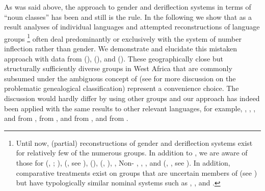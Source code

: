 \documentclass[output=collectionpaper]{langsci/langscibook}
\begin{document}
As was said above, the approach to  gender and deriflection systems in terms of ``noun classes'' has been and still is the rule. In the following we show that as a result analyses of individual languages and attempted reconstructions of language groups%
\footnote{Until now, (partial) reconstructions of gender and deriflection systems exist for relatively few of the numerous  groups. In addition to , we are aware of those for  (\citealt{Manessy1967}, \citeyear{Manessy1975}; \citealt{Miehe2012}),  (\citealt{Heine1968}, see ),  (\citealt{DeWolf1971}),  (\citealt{Bokula1971}, \citealt{Pasch1986}),  \citep{Doneux1975}, Non-  \citep{Hyman1980},  \citep{Elugbe1983},  \citep{Connell1987}, and  (\citealt{Manessy1987}, \citealt{Snider1988}, see ). In addition, comparative treatments exist on groups that are uncertain members of  (see \citealt{Gueldemann2018}) but have typologically similar nominal systems such as  \citep{Schadeberg1981a},  \citep{Schadeberg1981b}, and  \citep{Marchese1988}.} %
often deal predominantly or exclusively with the system of number inflection rather than gender. We demonstrate and elucidate this mistaken approach with data from  (),  (), and  (). These geographically close but structurally sufficiently diverse  groups in West Africa that are commonly subsumed under the ambiguous concept of  (see \citet{Gueldemann2018} for more discussion on the problematic genealogical classification) represent a convenience choice. The discussion would hardly differ by using other  groups and our approach has indeed been applied with the same results to other relevant languages, for example, , , , and  from ,  from ,  and  from , and  from .
\end{document}
